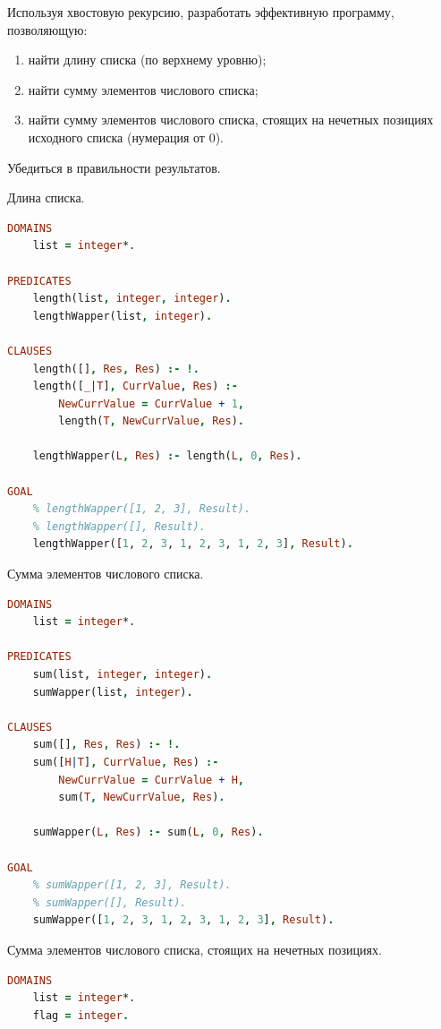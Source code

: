 \documentclass[a4paper,oneside,12pt]{extreport}
\begin{document}
\begin{task}
    Используя хвостовую рекурсию, разработать эффективную программу, позволяющую:

    \begin{enumerate}
        \item найти длину списка (по верхнему уровню);
        \item найти сумму элементов числового списка;
        \item найти сумму элементов числового списка, стоящих на нечетных позициях
        исходного списка (нумерация от 0).
    \end{enumerate}

    Убедиться в правильности результатов.

    Длина списка.
    \begin{lstlisting}[language=Prolog]
DOMAINS
    list = integer*.

PREDICATES
    length(list, integer, integer).
    lengthWapper(list, integer).
    
CLAUSES
    length([], Res, Res) :- !.
    length([_|T], CurrValue, Res) :- 
        NewCurrValue = CurrValue + 1,
        length(T, NewCurrValue, Res). 
    
    lengthWapper(L, Res) :- length(L, 0, Res).

GOAL
    % lengthWapper([1, 2, 3], Result).
    % lengthWapper([], Result).
    lengthWapper([1, 2, 3, 1, 2, 3, 1, 2, 3], Result).
    \end{lstlisting}

    Сумма элементов числового списка.
    \begin{lstlisting}[language=Prolog]
DOMAINS
    list = integer*.

PREDICATES
    sum(list, integer, integer).
    sumWapper(list, integer).
    
CLAUSES
    sum([], Res, Res) :- !.
    sum([H|T], CurrValue, Res) :- 
        NewCurrValue = CurrValue + H,
        sum(T, NewCurrValue, Res). 
    
    sumWapper(L, Res) :- sum(L, 0, Res).

GOAL
    % sumWapper([1, 2, 3], Result).
    % sumWapper([], Result).
    sumWapper([1, 2, 3, 1, 2, 3, 1, 2, 3], Result).
    \end{lstlisting}

    \newpage
    
    Сумма элементов числового списка, стоящих на нечетных позициях.
    \begin{lstlisting}[language=Prolog]
DOMAINS
    list = integer*.
    flag = integer. 


\end{lstlisting}
\end{task}
\end{document}

